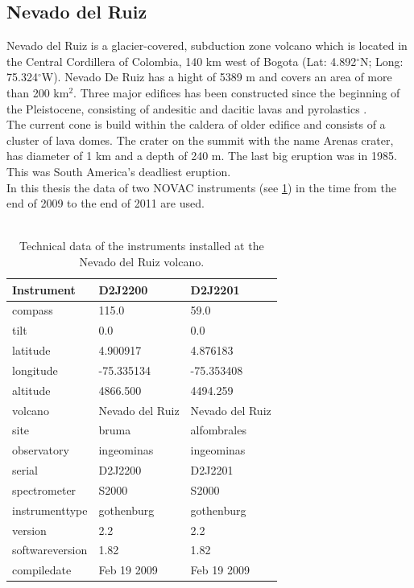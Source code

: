 		\subsection*{Nevado del Ruiz}
		Nevado del Ruiz is a glacier-covered, subduction zone volcano which is located in the Central Cordillera of Colombia, 140 km west of Bogota
		(Lat: 4.892$^{\circ}$N; Long: 75.324$^{\circ}$W). Nevado De Ruiz has a hight of 5389 m and covers an area of more than 200 km$^2$.
		Three major edifices has been constructed since the beginning of the Pleistocene, consisting of andesitic and dacitic lavas and pyrolastics \citep{GlobalVolcanismProgram}. \\
		The current cone is build within the caldera of older edifice and consists of a cluster of lava domes. The crater on the summit with the name Arenas crater, has diameter of 1 km and a depth of 240 m. 
		The last big eruption was in 1985. This was South America's deadliest eruption.\\
		In this thesis the data of two NOVAC instruments (see \cref{tab:NVDRInstruments}) in the time from the end of 2009 to the end of 2011 are used. \\
		\\
		\begin{table}
			\centering
			\begin{tabular}{|p{4cm}|p{3cm}|p{3cm}|}
				Instrument	&D2J2200&D2J2201\\
				\toprule
				compass&115.0		&59.0		\\
				tilt&0.0		&0.0		\\
				latitude&4.900917		&4.876183		\\
				longitude&-75.335134		&-75.353408		\\
				altitude&4866.500		&4494.259		\\
				volcano&Nevado del Ruiz		&Nevado del Ruiz		\\
				site&bruma	&alfombrales\\
				observatory&ingeominas		&ingeominas		\\
				serial&D2J2200		&D2J2201		\\
				spectrometer&S2000		&S2000		\\	
				instrumenttype&gothenburg		&gothenburg		\\
				version&2.2		&2.2		\\
				softwareversion&1.82		&1.82		\\
				compiledate&Feb 19 2009		&Feb 19 2009		\\
				\bottomrule
			\end{tabular}
			\caption{Technical data of the instruments installed at the Nevado del Ruiz volcano.}
			\label{tab:NVDRInstruments}
		\end{table}